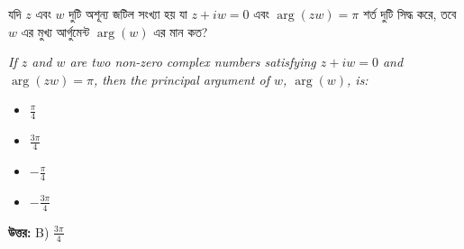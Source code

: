 \documentclass[12pt, a4paper]{article}
\begin{document}
\begin{tcolorbox}[questionbox={প্রশ্ন (Question) 2}]
    \noindent
    যদি $z$ এবং $w$ দুটি অশূন্য জটিল সংখ্যা হয় যা $z + iw = 0$ এবং $\arg(zw) = \pi$ শর্ত দুটি সিদ্ধ করে, তবে $w$ এর মুখ্য আর্গুমেন্ট $\arg(w)$ এর মান কত?
    
    \vspace{0.8em}
    \begin{english}
    \noindent\textit{\color{darkgray}
    If $z$ and $w$ are two non-zero complex numbers satisfying $z + iw = 0$ and $\arg(zw) = \pi$, then the principal argument of $w$, $\arg(w)$, is:
    }
    \end{english}
\end{tcolorbox}

\begin{itemize}[label={}, leftmargin=1cm, itemsep=0.5em]
    \item[\textbf{A)}] $\frac{\pi}{4}$
    \item[\textbf{B)}] $\frac{3\pi}{4}$
    \item[\textbf{C)}] $-\frac{\pi}{4}$
    \item[\textbf{D)}] $-\frac{3\pi}{4}$
\end{itemize}

\vspace{0.5em}
\begin{tcolorbox}[answerbox]
    \textbf{\color{success} উত্তর:} B) $\frac{3\pi}{4}$
\end{tcolorbox}
\vspace{1em}
\end{document}
